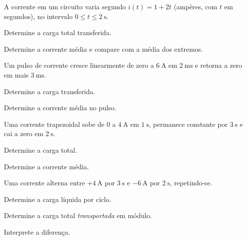 \blocoaprofundamento
\begin{questao}[3]{}

A corrente em um circuito varia segundo $i(t)=1+2t$ (ampères, com $t$ em
segundos), no intervalo $0\le t\le\SI{2}{\second}$.
\begin{itensq}
\item Determine a carga total transferida.
\item Determine a corrente média e compare com a média dos extremos.
\end{itensq}


\end{questao}
\begin{questao}[3]{}

Um pulso de corrente cresce linearmente de zero a $\SI{6}{\ampere}$ em
$\SI{2}{\milli\second}$ e retorna a zero em mais $\SI{3}{\milli\second}$.
\begin{itensq}
\item Determine a carga transferida.
\item Determine a corrente média no pulso.
\end{itensq}


\end{questao}
\begin{questao}[3]{}

Uma corrente trapezoidal sobe de $0$ a $\SI{4}{\ampere}$ em
$\SI{1}{\second}$, permanece constante por $\SI{3}{\second}$ e cai a zero em
$\SI{2}{\second}$.
\begin{itensq}
\item Determine a carga total.
\item Determine a corrente média.
\end{itensq}


\end{questao}
\begin{questao}[3]{}

Uma corrente alterna entre $+\SI{4}{\ampere}$ por $\SI{3}{\second}$ e
$-\SI{6}{\ampere}$ por $\SI{2}{\second}$, repetindo-se.
\begin{itensq}
\item Determine a carga líquida por ciclo.
\item Determine a carga total \emph{transportada} em módulo.
\item Interprete a diferença.
\end{itensq}


\end{questao}
